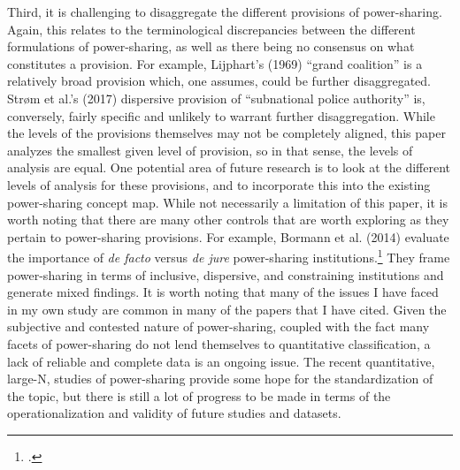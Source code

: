 \documentclass[12pt]{article}
\begin{document}
Third, it is challenging to disaggregate the different provisions of power-sharing. Again, this relates to the terminological discrepancies between the different formulations of power-sharing, as well as there being no consensus on what constitutes a provision. For example, Lijphart’s (1969) ``grand coalition'' is a relatively broad provision which, one assumes, could be further disaggregated. Strøm et al.’s (2017) dispersive provision of ``subnational police authority'' is, conversely, fairly specific and unlikely to warrant further disaggregation. While the levels of the provisions themselves may not be completely aligned, this paper analyzes the smallest given level of provision, so in that sense, the levels of analysis are equal. One potential area of future research is to look at the different levels of analysis for these provisions, and to incorporate this into the existing power-sharing concept map. While not necessarily a limitation of this paper, it is worth noting that there are many other controls that are worth exploring as they pertain to power-sharing provisions. For example, Bormann et al. (2014) evaluate the importance of \textit{de facto} versus \textit{de jure} power-sharing institutions.\footcite{bormann_does_2014} They frame power-sharing in terms of inclusive, dispersive, and constraining institutions and generate mixed findings. It is worth noting that many of the issues I have faced in my own study are common in many of the papers that I have cited. Given the subjective and contested nature of power-sharing, coupled with the fact many facets of power-sharing do not lend themselves to quantitative classification, a lack of reliable and complete data is an ongoing issue. The recent quantitative, large-N, studies of power-sharing provide some hope for the standardization of the topic, but there is still a lot of progress to be made in terms of the operationalization and validity of future studies and datasets.  
\end{document}
